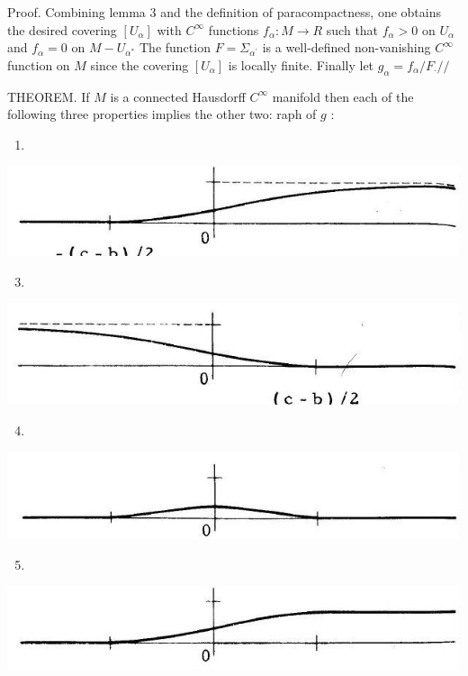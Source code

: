 \documentclass[10pt]{article}
\begin{document}
Proof. Combining lemma 3 and the definition of paracompactness, one obtains the desired covering $\left[U_{\alpha}\right]$ with $C^{\infty}$ functions $f_{\alpha}: M \rightarrow R$ such that $f_{\alpha}>0$ on $U_{\alpha}$ and $f_{\alpha}=0$ on $M-U_{\alpha^{*}}$ The function $F=\Sigma_{\alpha^{\prime}}$ is a well-defined non-vanishing $C^{\infty}$ function on $M$ since the covering $\left[U_{\alpha}\right]$ is locally finite. Finally let $g_{\alpha}=f_{\alpha} / F_{\cdot} / /$

THEOREM. If $M$ is a connected Hausdorff $C^{\infty}$ manifold then each of the following three properties implies the other two: raph of $g$ :

\begin{enumerate}
  \item 
\end{enumerate}
\includegraphics[max width=\textwidth]{2022_07_16_f4e476ee2159dc67e746g-47}

\begin{enumerate}
  \setcounter{enumi}{2}
  \item 
\end{enumerate}
\includegraphics[max width=\textwidth]{2022_07_16_f4e476ee2159dc67e746g-47(1)}

\begin{enumerate}
  \setcounter{enumi}{3}
  \item 
\end{enumerate}
\includegraphics[max width=\textwidth]{2022_07_16_f4e476ee2159dc67e746g-47(2)}

\begin{enumerate}
  \setcounter{enumi}{4}
  \item 
\end{enumerate}
\includegraphics[max width=\textwidth]{2022_07_16_f4e476ee2159dc67e746g-47(3)}
\end{document}
